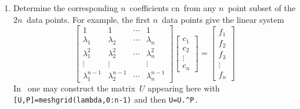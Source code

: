 \begin{procedure}
\begin{enumerate}
\item Determine the corresponding \(n\)~coefficients \hlist cn\ from any \(n\)~point subset of the \(2n\)~data points.
For example, the first \(n\)~data points give the linear system 
\begin{equation*}
\begin{bmatrix} 1&1&\cdots&1
\\\lambda_1&\lambda_2&\cdots&\lambda_n
\\\lambda_1^2&\lambda_2^2&\cdots&\lambda_n^2
\\\vdots&\vdots&&\vdots
\\\lambda_1^{n-1}&\lambda_2^{n-1}&\cdots&\lambda_n^{n-1}
 \end{bmatrix}\begin{bmatrix} c_1\\c_2\\\vdots\\c_n \end{bmatrix}
 =\begin{bmatrix} f_1\\f_2\\f_3\\\vdots\\f_n \end{bmatrix}
\end{equation*}
In \script\ one may construct the matrix~\(U\) appearing here with \verb|[U,P]=meshgrid(lambda,0:n-1)| and then \verb|U=U.^P|\,.
\end{enumerate}
\end{procedure}

